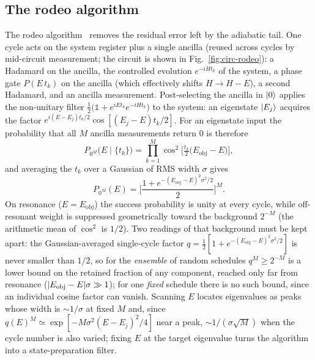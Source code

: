 \documentclass[
  aps,            %
  prc,            %
  reprint,        %
  superscriptaddress,
  floatfix,
  nofootinbib
]{revtex4-2}
\newcommand{\Eobj}{E_{\mathrm{obj}}}
\begin{document}
\subsection{The rodeo algorithm}
\label{sec:rodeo}
The rodeo algorithm~\cite{Choi2021,Qian2024} removes the residual error left by the
adiabatic tail.  One cycle acts on the system register plus a single ancilla
(reused across cycles by mid-circuit measurement; the circuit is shown in
Fig.~\ref{fig:circ-rodeo}): a Hadamard on the ancilla, the
controlled evolution $e^{-iH t_k}$ of the system, a phase gate $P(E\,t_k)$ on the
ancilla (which effectively shifts $H\to H-E$), a second Hadamard, and an ancilla
measurement.  Post-selecting the ancilla in $\ket{0}$ applies the non-unitary filter
$\tfrac12\big(\mathbb{1}+e^{iE t_k}e^{-iH t_k}\big)$ to the system: an eigenstate
$\ket{E_j}$ acquires the factor $e^{i(E-E_j)t_k/2}\cos[(E_j-E)t_k/2]$.  For an
eigenstate input the probability that all $M$ ancilla measurements return $0$ is
therefore~\cite{Qian2024}
\begin{equation}
  P_{0^{M}}\!\big(E\mid\{t_k\}\big)=\prod_{k=1}^{M}
  \cos^2\!\Big[\tfrac{t_k}{2}\big(\Eobj-E\big)\Big],
  \label{eq:rodeo1}
\end{equation}
and averaging the $t_k$ over a Gaussian of RMS width $\sigma$ gives
\begin{equation}
  P_{0^{M}}(E)=\Bigg[\frac{1+e^{-(\Eobj-E)^2\sigma^2/2}}{2}\Bigg]^{M}.
  \label{eq:rodeo2}
\end{equation}
On resonance ($E=\Eobj$) the success probability is unity at every cycle, while
off-resonant weight is suppressed geometrically toward the background $2^{-M}$ (the
arithmetic mean of $\cos^2$ is $1/2$).  Two readings of that background must
be kept apart: the Gaussian-averaged single-cycle factor
$q=\tfrac12[1+e^{-(\Eobj-E)^2\sigma^2/2}]$ is never smaller than $1/2$, so for
the \emph{ensemble} of random schedules $q^M\ge2^{-M}$ is a lower bound on the
retained fraction of any component, reached only far from resonance
($\abs{\Eobj-E}\sigma\gg1$); for one \emph{fixed} schedule there is no such
bound, since an individual cosine factor can vanish.  Scanning $E$ locates
eigenvalues as peaks whose width is $\sim1/\sigma$ at fixed $M$ and, since
$q(E)^M\simeq\exp[-M\sigma^2(E-E_j)^2/4]$ near a peak, $\sim1/(\sigma\sqrt M)$
when the cycle number is also varied; fixing $E$ at the target eigenvalue
turns the algorithm into a state-preparation filter.
\end{document}

